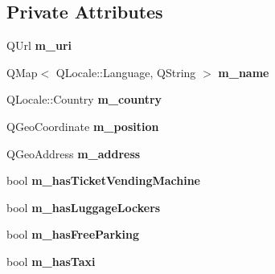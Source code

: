 \subsection*{Private Attributes}
\begin{DoxyCompactItemize}
\item 
\mbox{\label{classStationEngine_1_1Station_abc99eecfc04710a5f74c9f3f8e6abc41}} 
Q\+Url {\bfseries m\+\_\+uri}
\item 
\mbox{\label{classStationEngine_1_1Station_adf0d40cbc3e311d39b43cf54908220e6}} 
Q\+Map$<$ Q\+Locale\+::\+Language, Q\+String $>$ {\bfseries m\+\_\+name}
\item 
\mbox{\label{classStationEngine_1_1Station_a529f8a792b1e09637d10e492b478e155}} 
Q\+Locale\+::\+Country {\bfseries m\+\_\+country}
\item 
\mbox{\label{classStationEngine_1_1Station_af34113a0afb0761a935aca4a5e4a5319}} 
Q\+Geo\+Coordinate {\bfseries m\+\_\+position}
\item 
\mbox{\label{classStationEngine_1_1Station_a5a9a26f37ced339aa5e98f3b6549673e}} 
Q\+Geo\+Address {\bfseries m\+\_\+address}
\item 
\mbox{\label{classStationEngine_1_1Station_a7bf35478426698746ed5978f36af5fdb}} 
bool {\bfseries m\+\_\+has\+Ticket\+Vending\+Machine}
\item 
\mbox{\label{classStationEngine_1_1Station_a514bdca0fe29d7cee275c6731fa90854}} 
bool {\bfseries m\+\_\+has\+Luggage\+Lockers}
\item 
\mbox{\label{classStationEngine_1_1Station_af1dbda47c4bd273d56fcbfa3ce119cd8}} 
bool {\bfseries m\+\_\+has\+Free\+Parking}
\item 
\mbox{\label{classStationEngine_1_1Station_ab690f6111cd6130be03d1aa52498ad33}} 
bool {\bfseries m\+\_\+has\+Taxi}
\item 
\mbox{\label{classStationEngine_1_1Station_a72391e5ea24c3f9342b2617920754204}} 

\end{DoxyCompactItemize}

